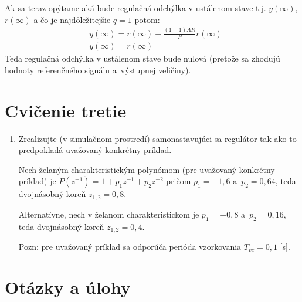 \documentclass[a4paper, 10pt, ]{article}
\begin{document}
Ak sa teraz opýtame aká bude regulačná odchýlka v ustálenom stave t.j. $y(\infty)$, $r(\infty)$ a čo je najdôležitejšie $q = 1$ potom:
\begin{equation}
	\begin{split}
		& y(\infty) =r(\infty) -  \frac{(1-1)AR}{P}r(\infty)
		\\& y(\infty) =r(\infty)
	\end{split}
\end{equation}
Teda regulačná odchýlka v ustálenom stave bude nulová (pretože sa zhodujú hodnoty referenčného signálu a~výstupnej veličiny).











\section{Cvičenie tretie}
\label{cvictretie}


\begin{enumerate}

	\item Zrealizujte (v simulačnom prostredí) samonastavujúci sa regulátor tak ako to predpokladá uvažovaný konkrétny príklad.

	Nech želaným charakteristickým polynómom (pre uvažovaný konkrétny príklad) je $P(z^{-1}) = 1 + p_1z^{-1} + p_2z^{-2}$ pričom $p_1 = -1,6$ a~$p_2 = 0,64$, teda dvojnásobný koreň $z_{1,2} = 0,8$.

	Alternatívne, nech v želanom charakteristickom je $p_1 = -0,8$ a~$p_2 = 0,16$, teda dvojnásobný koreň $z_{1,2} = 0,4$.

	Pozn: pre uvažovaný príklad sa odporúča perióda vzorkovania $T_{vz} = 0,1$ [s].

\end{enumerate}









\section*{Otázky a úlohy}
\end{document}

